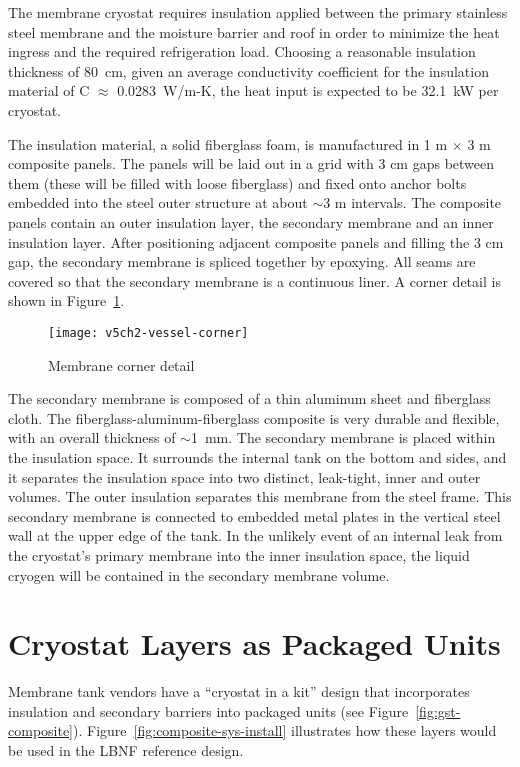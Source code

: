 The membrane cryostat requires insulation applied between the 
primary stainless steel membrane and the moisture barrier and 
roof in order to minimize the heat ingress and the required 
refrigeration load. Choosing a reasonable insulation 
thickness of 80~cm, given an average conductivity coefficient 
for the insulation material of C $\approx$ 0.0283~W/m-K, the 
heat input is expected to be 32.1~kW 
per cryostat. %



The insulation material, a solid fiberglass foam, is manufactured in 1 m 
$\times$ 3 m composite panels. The panels will be laid out in a grid with 
3 cm gaps between them (these will be filled with loose fiberglass) and 
fixed onto anchor bolts embedded into the steel outer structure
at about $\sim$3 m intervals. 
The composite panels contain an outer insulation layer, the secondary 
membrane and an inner insulation layer. After positioning adjacent 
composite panels and filling the 3 cm gap, the secondary membrane 
is spliced together by epoxying. All seams are covered so that the secondary
membrane is a continuous liner. A corner detail is shown 
in Figure~\ref{fig:vessel-corner}.


\begin{figure}[htbp]
\centering
\texttt{[image: v5ch2-vessel-corner]}
\caption{Membrane corner detail}
\label{fig:vessel-corner} %
\end{figure}

The secondary membrane is composed of a thin aluminum sheet and 
fiberglass cloth. The fiberglass-aluminum-fiberglass composite is 
very durable and flexible, with an overall thickness of $\sim$1~mm.  
The secondary membrane is placed within the insulation space. It 
surrounds the internal tank on the bottom and sides, and it 
separates the insulation space into two distinct, leak-tight, 
inner and outer volumes. The outer insulation separates this 
membrane from the steel frame. This secondary membrane is connected 
to embedded metal plates in the vertical steel wall at the upper 
edge of the tank. In the unlikely event of an internal leak from 
the cryostat's primary membrane into the inner insulation space, 
the liquid cryogen will be contained in the 
secondary membrane volume.  

\section{Cryostat Layers as Packaged Units}
Membrane tank vendors have a ``cryostat in a kit'' design that 
incorporates insulation and secondary barriers into packaged 
units (see Figure~\ref{fig:gst-composite}).  
Figure~\ref{fig:composite-sys-install} illustrates how these 
layers would be used in the LBNF reference design.

